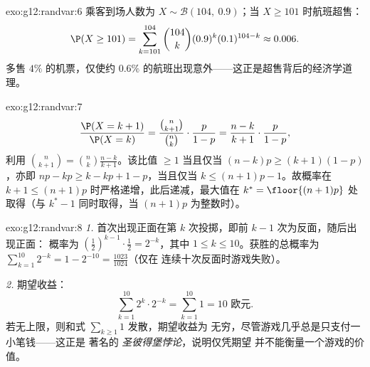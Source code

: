 \begin{solution}{exo:g12:randvar:6}
乘客到场人数为 $X \sim \mathcal B(104,\ 0.9)$；当
$X \geq 101$ 时航班超售：
\[
\P(X \geq 101) = \sum_{k=101}^{104}\binom{104}{k}(0.9)^k(0.1)^{104-k}
\approx 0.006 .
\]
多售 $4\%$ 的机票，仅使约
$0.6\%$ 的航班出现意外——这正是超售背后的经济学道理。
\end{solution}

\begin{solution}{exo:g12:randvar:7}
\[
\frac{\P(X = k+1)}{\P(X = k)}
= \frac{\binom{n}{k+1}}{\binom nk}\cdot\frac{p}{1-p}
= \frac{n - k}{k + 1}\cdot\frac{p}{1-p},
\]
利用 $\binom{n}{k+1} = \binom nk \frac{n-k}{k+1}$。该比值 $\geq 1$
当且仅当 $(n-k)p \geq (k+1)(1-p)$，亦即 $np - k p \geq k - kp + 1 - p$，当且仅当
$k \leq (n+1)p - 1$。故概率在
$k + 1 \leq (n+1)p$ 时严格递增，此后递减，最大值在
$k^* = \floor{(n+1)p}$ 处取得（与 $k^* - 1$ 同时取得，当
$(n+1)p$ 为整数时）。
\end{solution}

\begin{solution}{exo:g12:randvar:8}
\emph{1.} 首次出现正面在第 $k$ 次投掷，即前 $k-1$ 次为反面，随后出现正面：
概率为 $\left(\frac12\right)^{k-1}\cdot\frac12 = 2^{-k}$，其中
$1 \leq k \leq 10$。获胜的总概率为
$\sum_{k=1}^{10} 2^{-k} = 1 - 2^{-10} = \frac{1023}{1024}$（仅在
连续十次反面时游戏失败）。

\emph{2.} 期望收益：
\[
\sum_{k=1}^{10} 2^k \cdot 2^{-k} = \sum_{k=1}^{10} 1 = 10 \text{ 欧元}.
\]
若无上限，则和式 $\sum_{k\geq1} 1$ 发散，期望收益为
无穷，尽管游戏几乎总是只支付一小笔钱——这正是
著名的 \emph{圣彼得堡悖论}，说明仅凭期望
并不能衡量一个游戏的价值。
\end{solution}


